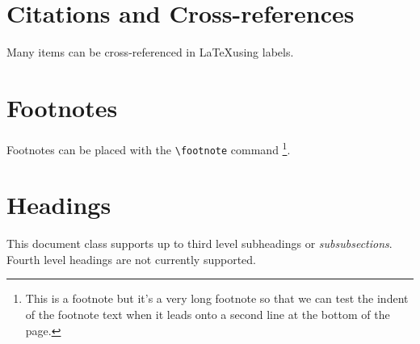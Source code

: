 \section*{Citations and Cross-references}
Many items can be cross-referenced in \LaTeX using labels.\cite{customBibLabel}

\section*{Footnotes}
Footnotes can be placed with the \texttt{\textbackslash footnote} command
\footnote{This is a footnote but it's a very long footnote so that we can test the indent of the footnote text when it leads onto a second line at the bottom of the page.}. 

\section*{Headings}
This document class supports up to third level subheadings or \emph{subsubsections}. Fourth level headings are not currently supported.
